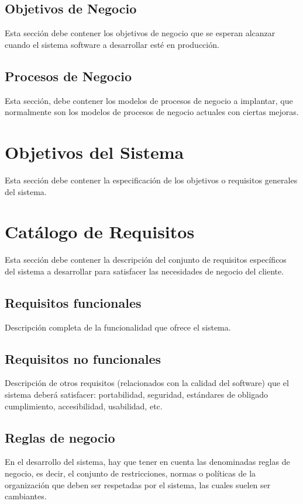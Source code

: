\subsection{Objetivos de Negocio}
Esta sección debe contener los objetivos de negocio que se esperan alcanzar cuando el sistema software a desarrollar esté en producción.

\subsection{Procesos de Negocio}
Esta sección, debe contener los modelos de procesos de negocio a implantar, que normalmente son los modelos de procesos de negocio actuales con ciertas mejoras.

\section{Objetivos del Sistema}
Esta sección debe contener la especificación de los objetivos o requisitos generales del sistema.

\section{Catálogo de Requisitos}
Esta sección debe contener la descripción del conjunto de requisitos específicos del sistema a desarrollar para satisfacer las necesidades de negocio del cliente.

\subsection{Requisitos funcionales}
Descripción completa de la funcionalidad que ofrece el sistema. 

\subsection{Requisitos no funcionales}
Descripción de otros requisitos (relacionados con la calidad del software) que el sistema deberá satisfacer: portabilidad, seguridad, estándares de obligado cumplimiento, accesibilidad, usabilidad, etc.

\subsection{Reglas de negocio}
En el desarrollo del sistema, hay que tener en cuenta las denominadas reglas de negocio, es decir, el conjunto de restricciones, normas o políticas de la organización que deben ser respetadas por el sistema, las cuales suelen ser cambiantes.

